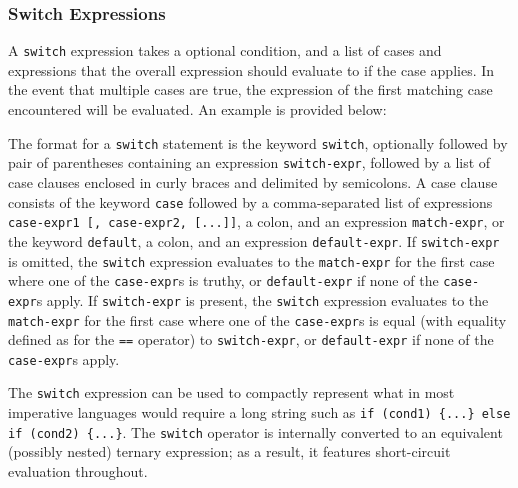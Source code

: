 \subsubsection{Switch Expressions}
\label{sec:Switch}
A \texttt{switch} expression takes a optional condition, and a list of cases and expressions that the overall expression should evaluate to if the case applies. In the event that multiple cases are true, the expression of the first matching case encountered will be evaluated. An example is provided below:

The format for a \texttt{switch} statement is the keyword \texttt{switch}, optionally followed by pair of parentheses containing an expression \texttt{switch-expr}, followed by a list of case clauses enclosed in curly braces and delimited by semicolons. A case clause consists of the keyword \texttt{case} followed by a comma-separated list of expressions \texttt{case-expr1 [, case-expr2, [...]]}, a colon, and an expression \texttt{match-expr}, or the keyword \texttt{default}, a colon, and an expression \texttt{default-expr}. If \texttt{switch-expr} is omitted, the \texttt{switch} expression evaluates to the \texttt{match-expr} for the first case where one of the \texttt{case-expr}s is truthy, or \texttt{default-expr} if none of the \texttt{case-expr}s apply. If \texttt{switch-expr} is present, the \texttt{switch} expression evaluates to the \texttt{match-expr} for the first case where one of the \texttt{case-expr}s is equal (with equality defined as for the \texttt{==} operator) to \texttt{switch-expr}, or \texttt{default-expr} if none of the \texttt{case-expr}s apply.

The \texttt{switch} expression can be used to compactly represent what in most imperative languages would require a long string such as \texttt{if (cond1) \{...\} else if (cond2) \{...\}}. The \texttt{switch} operator is internally converted to an equivalent (possibly nested) ternary expression; as a result, it features short-circuit evaluation throughout.

